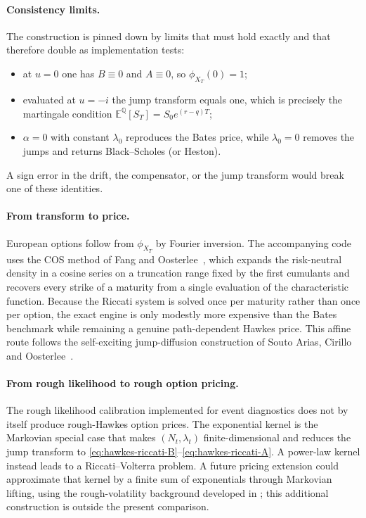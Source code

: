 \documentclass[a4paper,10pt,titlepage,oneside,openany]{book}
\theoremstyle{plain}
\theoremstyle{definition}
\theoremstyle{remark}
\newcommand{\E}{\mathbb{E}}
\newcommand{\Q}{\mathbb{Q}}
\begin{document}
\paragraph{Consistency limits.}
The construction is pinned down by limits that must hold exactly and that therefore double as implementation tests:
\begin{itemize}[leftmargin=8mm, itemsep=2pt]
    \item at \(u=0\) one has \(B\equiv0\) and \(A\equiv0\), so \(\phi_{X_T}(0)=1\);
    \item evaluated at \(u=-i\) the jump transform equals one, which is precisely the martingale condition \(\E^\Q[S_T]=S_0e^{(r-q)T}\);
    \item \(\alpha=0\) with constant \(\lambda_0\) reproduces the Bates price, while \(\lambda_0=0\) removes the jumps and returns Black--Scholes (or Heston).
\end{itemize}
A sign error in the drift, the compensator, or the jump transform would break one of these identities.

\paragraph{From transform to price.}
European options follow from \(\phi_{X_T}\) by Fourier inversion. The accompanying code uses the COS method of Fang and Oosterlee~\cite{FangOosterlee2008}, which expands the risk-neutral density in a cosine series on a truncation range fixed by the first cumulants and recovers every strike of a maturity from a single evaluation of the characteristic function. Because the Riccati system is solved once per maturity rather than once per option, the exact engine is only modestly more expensive than the Bates benchmark while remaining a genuine path-dependent Hawkes price. This affine route follows the self-exciting jump-diffusion construction of Souto Arias, Cirillo and Oosterlee~\cite{SoutoArias2023}.

\paragraph{From rough likelihood to rough option pricing.}
The rough likelihood calibration implemented for event diagnostics does not by itself produce rough-Hawkes option prices. The exponential kernel is the Markovian special case that makes \((N_t,\lambda_t)\) finite-dimensional and reduces the jump transform to \eqref{eq:hawkes-riccati-B}--\eqref{eq:hawkes-riccati-A}. A power-law kernel instead leads to a Riccati--Volterra problem. A future pricing extension could approximate that kernel by a finite sum of exponentials through Markovian lifting, using the rough-volatility background developed in \cite{MessinaSoriano2026}; this additional construction is outside the present comparison.
\end{document}
